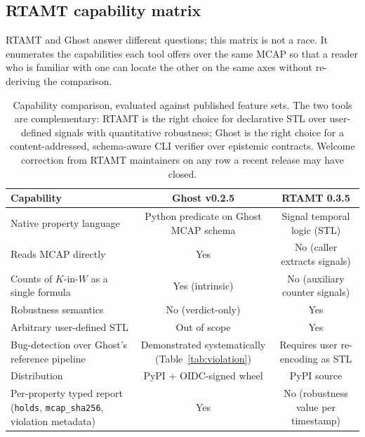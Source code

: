 \documentclass[11pt,a4paper]{article}
\begin{document}
\subsection{RTAMT capability matrix}

RTAMT and Ghost answer different questions; this matrix is not a
race. It enumerates the capabilities each tool offers over the
same MCAP so that a reader who is familiar with one can locate
the other on the same axes without re-deriving the comparison.

\begin{table}[h]
\centering\small
\begin{tabularx}{\linewidth}{X c c}
\toprule
\textbf{Capability} & \textbf{Ghost v0.2.5} & \textbf{RTAMT 0.3.5} \\
\midrule
Native property language & Python predicate on Ghost MCAP schema & Signal temporal logic (STL) \\
Reads MCAP directly & Yes & No (caller extracts signals) \\
Counts of $K$-in-$W$ as a single formula & Yes (intrinsic) & No (auxiliary counter signals) \\
Robustness semantics & No (verdict-only) & Yes \\
Arbitrary user-defined STL & Out of scope & Yes \\
Bug-detection over Ghost's reference pipeline & Demonstrated systematically (Table~\ref{tab:violation}) & Requires user re-encoding as STL \\
Distribution & PyPI + OIDC-signed wheel & PyPI source \\
Per-property typed report (\texttt{holds}, \texttt{mcap\_sha256}, violation metadata) & Yes & No (robustness value per timestamp) \\
\bottomrule
\end{tabularx}
\caption{Capability comparison, evaluated against published
feature sets. The two tools are complementary: RTAMT is the right
choice for declarative STL over user-defined signals with
quantitative robustness; Ghost is the right choice for a
content-addressed, schema-aware CLI verifier over epistemic
contracts. Welcome correction from RTAMT maintainers on any row
a recent release may have closed.}
\label{tab:rtamt-bench}
\end{table}
\end{document}
